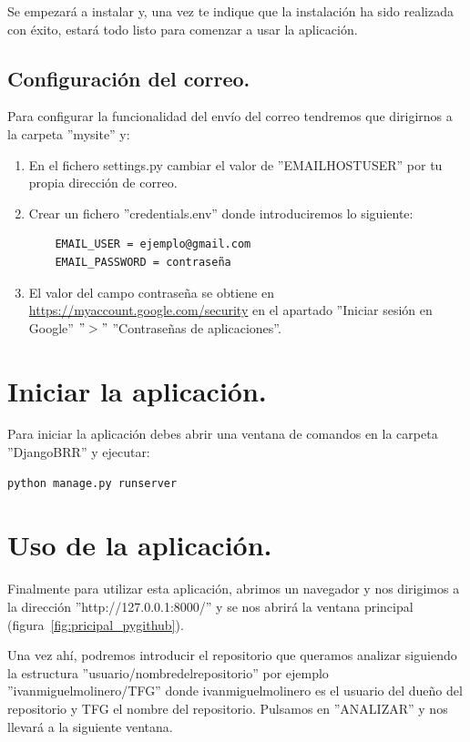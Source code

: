 \documentclass[a4paper, 12pt]{book}
\begin{document}
Se empezará a instalar y, una vez te indique que la instalación ha sido realizada con éxito, estará todo listo para comenzar a usar la aplicación.

\subsection{Configuración del correo.}

Para configurar la funcionalidad del envío del correo tendremos que dirigirnos a la carpeta ''mysite'' y:

\begin{enumerate}
	\item En el fichero settings.py cambiar el valor de ''EMAIL\textunderscore HOST\textunderscore USER'' por tu propia dirección de correo.
	\item Crear un fichero ''credentials.env'' donde introduciremos lo siguiente:
	\begin{verbatim}
	EMAIL_USER = ejemplo@gmail.com
	EMAIL_PASSWORD = contraseña
	\end{verbatim}
	\item El valor del campo contraseña se obtiene en \url{https://myaccount.google.com/security} en el apartado ''Iniciar sesión en Google'' $">"$ ''Contraseñas de aplicaciones''.
\end{enumerate}

\section{Iniciar la aplicación.}

Para iniciar la aplicación debes abrir una ventana de comandos en la carpeta ''Django\textunderscore BRR'' y ejecutar:

\begin{verbatim}
python manage.py runserver
\end{verbatim}

\section{Uso de la aplicación.}

Finalmente para utilizar esta aplicación, abrimos un navegador y nos dirigimos a la dirección ''http://127.0.0.1:8000/'' y se nos abrirá la ventana principal (figura~\ref{fig:pricipal_pygithub}).

Una vez ahí, podremos introducir el repositorio que queramos analizar siguiendo la estructura ''usuario/nombre\textunderscore del\textunderscore repositorio'' por ejemplo ''ivanmiguelmolinero/TFG'' donde ivanmiguelmolinero es el usuario del dueño del repositorio y TFG el nombre del repositorio. Pulsamos en ''ANALIZAR'' y nos llevará a la siguiente ventana.
\end{document}
